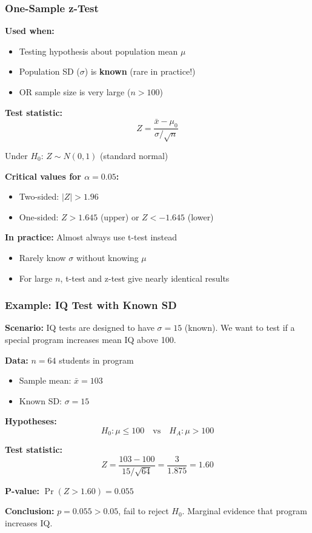 \documentclass{beamer}
\begin{document}
\begin{frame}
\frametitle{One-Sample z-Test}
\textbf{Used when:}
\begin{itemize}
\item Testing hypothesis about population mean $\mu$
\item Population SD ($\sigma$) is \textbf{known} (rare in practice!)
\item OR sample size is very large ($n > 100$)
\end{itemize}

\vspace{0.1cm}
\textbf{Test statistic:}
$$Z = \frac{\bar{x} - \mu_0}{\sigma/\sqrt{n}}$$

\vspace{0.1cm}
Under $H_0$: $Z \sim N(0, 1)$ (standard normal)

\vspace{0.1cm}
\textbf{Critical values for $\alpha = 0.05$:}
\begin{itemize}
\item Two-sided: $|Z| > 1.96$
\item One-sided: $Z > 1.645$ (upper) or $Z < -1.645$ (lower)
\end{itemize}

\vspace{0.1cm}
\textbf{In practice:} Almost always use t-test instead
\begin{itemize}
\item Rarely know $\sigma$ without knowing $\mu$
\item For large $n$, t-test and z-test give nearly identical results
\end{itemize}
\end{frame}

\begin{frame}
\frametitle{Example: IQ Test with Known SD}
\textbf{Scenario:} IQ tests are designed to have $\sigma = 15$ (known). We want to test if a special program increases mean IQ above 100.

\vspace{0.2cm}
\textbf{Data:} $n = 64$ students in program
\begin{itemize}
\item Sample mean: $\bar{x} = 103$
\item Known SD: $\sigma = 15$
\end{itemize}

\vspace{0.4cm}
\textbf{Hypotheses:}
$$H_0: \mu \leq 100 \quad \text{vs} \quad H_A: \mu > 100$$

\vspace{0.2cm}
\textbf{Test statistic:}
$$Z = \frac{103 - 100}{15/\sqrt{64}} = \frac{3}{1.875} = 1.60$$

\vspace{0.2cm}
\textbf{P-value:} $\Pr(Z > 1.60) = 0.055$

\vspace{0.2cm}
\textbf{Conclusion:} $p = 0.055 > 0.05$, fail to reject $H_0$. Marginal evidence that program increases IQ.
\end{frame}
\end{document}
